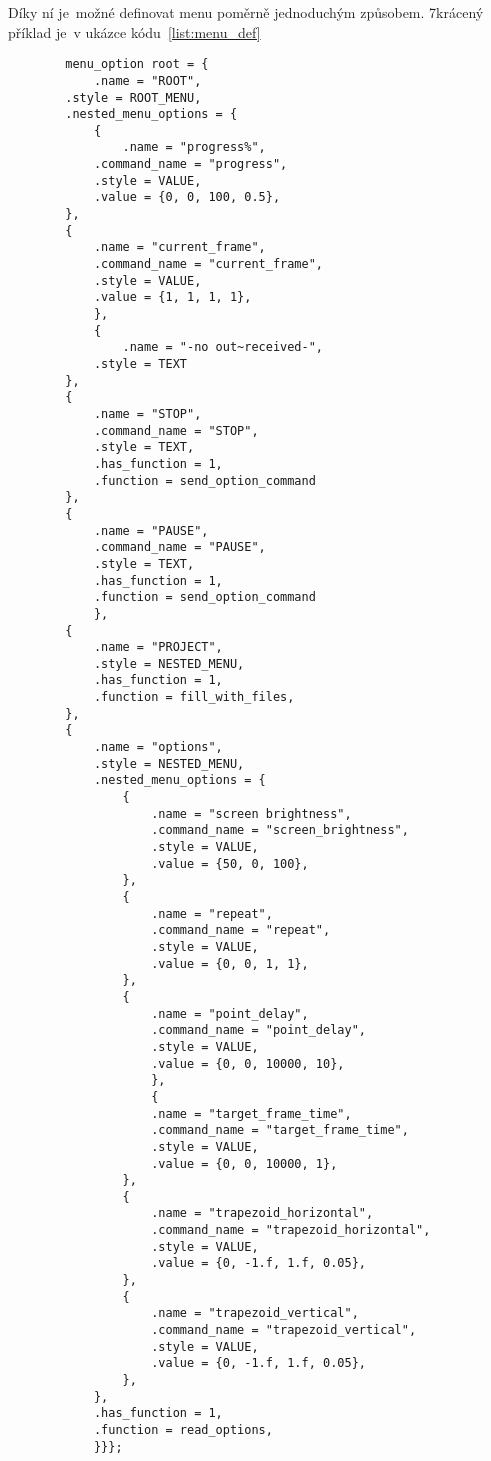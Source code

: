 Díky ní je~možné definovat menu poměrně jednoduchým způsobem. 7krácený příklad je~v ukázce kódu~\ref{list:menu_def}
\begin{code}
    \begin{verbatim}
        menu_option root = {
            .name = "ROOT",
        .style = ROOT_MENU,
        .nested_menu_options = {
            {
                .name = "progress%",
            .command_name = "progress",
            .style = VALUE,
            .value = {0, 0, 100, 0.5},
        },
        {
            .name = "current_frame",
            .command_name = "current_frame",
            .style = VALUE,
            .value = {1, 1, 1, 1},
            },
            {
                .name = "-no out~received-",
            .style = TEXT
        },
        {
            .name = "STOP",
            .command_name = "STOP",
            .style = TEXT,
            .has_function = 1,
            .function = send_option_command
        },
        {
            .name = "PAUSE",
            .command_name = "PAUSE",
            .style = TEXT,
            .has_function = 1,
            .function = send_option_command
            },
        {
            .name = "PROJECT",
            .style = NESTED_MENU,
            .has_function = 1,
            .function = fill_with_files,
        },
        {
            .name = "options",
            .style = NESTED_MENU,
            .nested_menu_options = {
                {
                    .name = "screen brightness",
                    .command_name = "screen_brightness",
                    .style = VALUE,
                    .value = {50, 0, 100},
                },
                {
                    .name = "repeat",
                    .command_name = "repeat",
                    .style = VALUE,
                    .value = {0, 0, 1, 1},
                },
                {
                    .name = "point_delay",
                    .command_name = "point_delay",
                    .style = VALUE,
                    .value = {0, 0, 10000, 10},
                    },
                    {
                    .name = "target_frame_time",
                    .command_name = "target_frame_time",
                    .style = VALUE,
                    .value = {0, 0, 10000, 1},
                },
                {
                    .name = "trapezoid_horizontal",
                    .command_name = "trapezoid_horizontal",
                    .style = VALUE,
                    .value = {0, -1.f, 1.f, 0.05},
                },
                {
                    .name = "trapezoid_vertical",
                    .command_name = "trapezoid_vertical",
                    .style = VALUE,
                    .value = {0, -1.f, 1.f, 0.05},
                },
            },
            .has_function = 1,
            .function = read_options,
            }}};
        \end{verbatim}
    \end{code}
        
